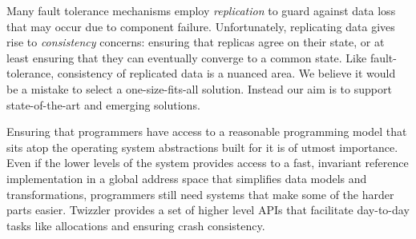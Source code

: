     Many fault tolerance mechanisms employ \emph{replication} to guard against data loss that may occur
    due to component failure.
    Unfortunately, replicating data gives rise to \emph{consistency} concerns: ensuring that replicas agree on their state,
    or at least ensuring that they can eventually converge to a common state.  Like fault-tolerance, consistency of replicated data
    is a nuanced area.  We believe it would be a mistake to select a one-size-fits-all solution.  Instead our aim is to support
    state-of-the-art and emerging solutions.

\fi



\begin{chconc}
    Ensuring that programmers have access to a reasonable programming model that sits atop the operating system
    abstractions built for it is of utmost importance. Even if the lower levels of the system provides access to a fast,
    invariant reference implementation in a global address space that simplifies data models and transformations, programmers still
    need systems that make some of the harder parts easier. Twizzler provides a set of higher level APIs that facilitate
    day-to-day tasks like allocations and ensuring crash consistency.
\end{chconc}


